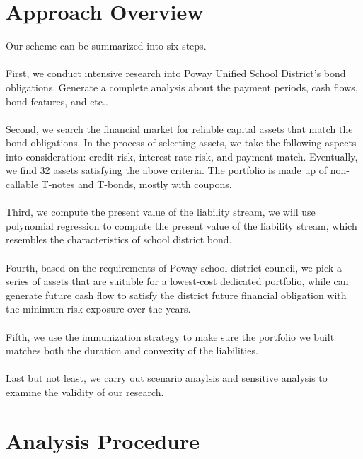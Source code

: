 \documentclass[oneside,12pt]{report}
\begin{document}
\section{Approach Overview}
 Our scheme can be summarized into six steps. \\
\\
First, we conduct intensive research into Poway Unified School District's bond obligations. Generate a complete analysis about the payment periods, cash flows, bond features, and etc..\\
\\
Second, we search the financial market for reliable capital assets that match the bond obligations. In the process of selecting assets, we take the following aspects into consideration: credit risk, interest rate risk, and payment match. Eventually, we find 32 assets satisfying the above criteria. The portfolio is made up of non-callable T-notes and T-bonds, mostly with coupons.\\
\\
Third, we compute the present value of the liability stream, we will use polynomial regression to compute the present value of the liability stream, which resembles the characteristics of school district bond. \\
\\
Fourth, based on the requirements of Poway school district council, we pick a series of assets that are suitable for a lowest-cost dedicated portfolio, while can generate future cash flow to satisfy the district future financial obligation with the minimum risk exposure over the years.\\
\\
Fifth, we use the immunization strategy to make sure the portfolio we built matches both the duration and convexity of the liabilities.\\
\\
Last but not least, we carry out scenario anaylsis and sensitive analysis to examine the validity of our research.
\newpage
\section{Analysis Procedure}
\end{document}
